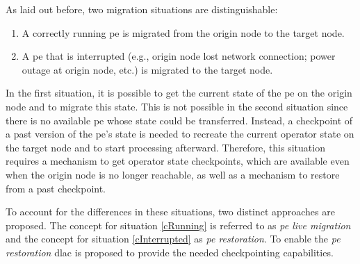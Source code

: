 As laid out before, two migration situations are distinguishable:
\begin{enumerate}
    \item \label{cRunning} A correctly running \gls{pe} is migrated from the origin node to the target node.
    \item \label{cInterrupted} A \gls{pe} that is interrupted (e.g., origin node lost network connection; power outage at origin node, etc.) is migrated to the target node.
\end{enumerate}

In the first situation, it is possible to get the current state of the \gls{pe} on the origin node and to migrate this state. This is not possible in the second situation since there is no available \gls{pe} whose state could be transferred. Instead, a checkpoint of a past version of the \gls{pe}'s state is needed to recreate the current operator state on the target node and to start processing afterward. Therefore, this situation requires a mechanism to get operator state checkpoints, which are available even when the origin node is no longer reachable, as well as a mechanism to restore from a past checkpoint.\par

To account for the differences in these situations, two distinct approaches are proposed. The concept for situation \ref{cRunning} is referred to as \textit{\textit{\acrshort{pe} live migration}} and the concept for situation \ref{cInterrupted} as \textit{\textit{\acrshort{pe} restoration}}. To enable the \textit{\acrshort{pe} restoration} \acrfull{dlac} is proposed to provide the needed checkpointing capabilities.\par

